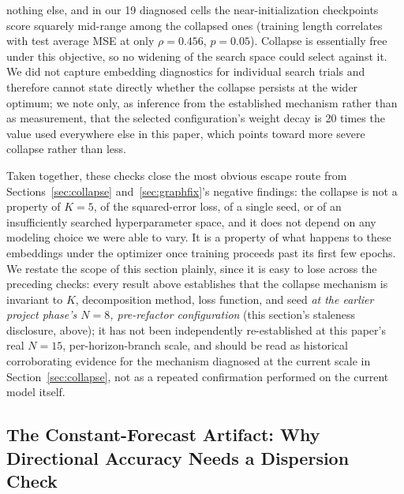\documentclass[journal]{IEEEtran}
\begin{document}
nothing else, and in our 19 diagnosed cells the near-initialization checkpoints
score squarely mid-range among the collapsed ones (training length correlates with
test average MSE at only $\rho = 0.456$, $p = 0.05$). Collapse is essentially free
under this objective, so no widening of the search space could select against it.
We did not capture embedding diagnostics for individual search trials and
therefore cannot state directly whether the collapse persists at the wider
optimum; we note only, as inference from the established mechanism rather than as
measurement, that the selected configuration's weight decay is 20 times the value
used everywhere else in this paper, which points toward more severe collapse
rather than less.

Taken together, these checks close the most obvious escape route from
Sections~\ref{sec:collapse} and~\ref{sec:graphfix}'s negative findings: the
collapse is not a property of $K=5$, of the squared-error loss, of a single seed,
or of an insufficiently searched hyperparameter space, and it does not depend on
any modeling choice we were able to vary. It is a property of what happens to
these embeddings under the optimizer once training proceeds past its first few
epochs. We restate the scope of this section plainly, since it is easy to lose
across the preceding checks: every result above establishes that the collapse
mechanism is invariant to $K$, decomposition method, loss function, and seed
\emph{at the earlier project phase's $N=8$, pre-refactor configuration}
(this section's staleness disclosure, above); it has not been independently
re-established at this paper's real $N=15$, per-horizon-branch scale, and
should be read as historical corroborating evidence for the mechanism
diagnosed at the current scale in Section~\ref{sec:collapse}, not as a
repeated confirmation performed on the current model itself.

\subsection{The Constant-Forecast Artifact: Why Directional Accuracy Needs a Dispersion Check}
\label{sec:constantforecast}
\end{document}
